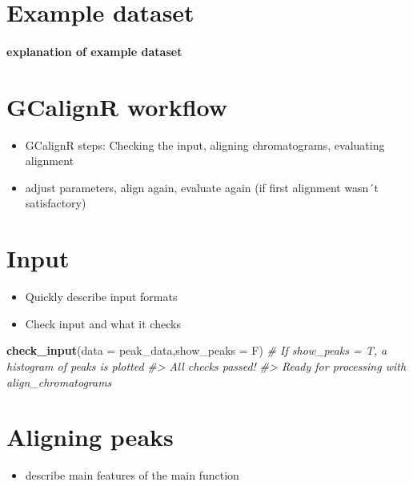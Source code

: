 \documentclass[]{article}
\newenvironment{Shaded}{}{}
\newcommand{\KeywordTok}[1]{\textbf{{#1}}}
\newcommand{\DataTypeTok}[1]{\textcolor[rgb]{0.50,0.00,0.00}{{#1}}}
\newcommand{\CommentTok}[1]{\textcolor[rgb]{0.50,0.50,0.50}{\textit{{#1}}}}
\newcommand{\NormalTok}[1]{{#1}}
\providecommand{\tightlist}{%
  \setlength{\itemsep}{0pt}\setlength{\parskip}{0pt}}
\let\oldparagraph\paragraph
\renewcommand{\paragraph}[1]{\oldparagraph{#1}\mbox{}}
\begin{document}
\section{Example dataset}\label{example-dataset}

\paragraph{explanation of example
dataset}\label{explanation-of-example-dataset}

\section{GCalignR workflow}\label{gcalignr-workflow}

\begin{itemize}
\tightlist
\item
  GCalignR steps: Checking the input, aligning chromatograms, evaluating
  alignment
\item
  adjust parameters, align again, evaluate again (if first alignment
  wasn´t satisfactory)
\end{itemize}

\section{Input}\label{input}

\begin{itemize}
\tightlist
\item
  Quickly describe input formats
\item
  Check input and what it checks
\end{itemize}

\begin{Shaded}
\begin{Highlighting}[]
\KeywordTok{check_input}\NormalTok{(}\DataTypeTok{data =} \NormalTok{peak_data,}\DataTypeTok{show_peaks =} \NormalTok{F) }\CommentTok{# If show_peaks = T, a histogram of peaks is plotted }
\CommentTok{#> All checks passed!}
\CommentTok{#> Ready for processing with align_chromatograms}
\end{Highlighting}
\end{Shaded}

\section{Aligning peaks}\label{aligning-peaks}

\begin{itemize}
\tightlist
\item
  describe main features of the main function
\end{itemize}
\end{document}
